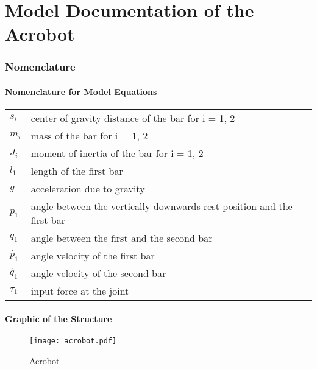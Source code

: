 \documentclass[10pt,a4paper]{article}
\begin{document}
	\part*{Model Documentation of the \\ Acrobot} %
	
	
	\section{Nomenclature} %
	\subsection{Nomenclature for Model Equations} %
	
	\begin{tabular}{ll}
		$s_i$ & center of gravity distance of the bar for i = 1, 2 \\
		$m_i$ & mass of the bar for i = 1, 2 \\
		$J_i$ & moment of inertia of the bar for i = 1, 2 \\
		$l_1$ & length of the first bar \\
		$g$ & acceleration due to gravity \\
		$p_1$ & angle between the vertically downwards rest position and the first bar \\
		$q_1$ & angle between the first and the second bar \\
		$\dot{p_1}$ & angle velocity of the first bar \\
		$\dot{q_1}$ & angle velocity of the second bar \\
		$\tau_1$ & input force at the joint \\
				
	\end{tabular}
	
	\subsection{Graphic of the Structure}	
	\begin{figure}[H]
		\centering
		\texttt{[image: acrobot.pdf]}
		\caption{Acrobot}
	\end{figure}
	 
	\begin{tabular}{ll}

	\end{tabular}
	
\end{document}
